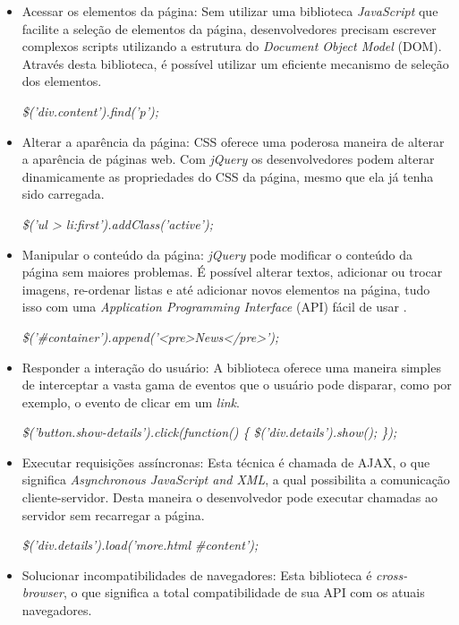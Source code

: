 \begin{itemize}
\item Acessar os elementos da página: Sem utilizar uma biblioteca \textit{JavaScript} que facilite a seleção de elementos da página, desenvolvedores precisam escrever complexos scripts utilizando a estrutura do \textit{Document Object Model} (DOM). Através desta biblioteca, é possível utilizar um eficiente mecanismo de seleção dos elementos.

\begin{center}
\textit{\$('div.content').find('p');}
\end{center}

\item Alterar a aparência da página: CSS oferece uma poderosa maneira de alterar a aparência de páginas web. Com \textit{jQuery} os desenvolvedores podem alterar dinamicamente as propriedades do CSS da página, mesmo que ela já tenha sido carregada.

\begin{center}
\textit{\$('ul > li:first').addClass('active');}
\end{center}

\item Manipular o conteúdo da página: \textit{jQuery} pode modificar o conteúdo da página sem maiores problemas. É possível alterar textos, adicionar ou trocar imagens, re-ordenar listas e até adicionar novos elementos na página, tudo isso com uma \textit{Application Programming Interface} (API) fácil de usar \cite{JQUERY-API}.

\begin{center}
\textit{\$('\#container').append('<pre>News</pre>');}
\end{center}

\item Responder a interação do usuário: A biblioteca oferece uma maneira simples de interceptar a vasta gama de eventos que o usuário pode disparar, como por exemplo, o evento de clicar em um \textit{link}.

\begin{center}
\textit{\$('button.show-details').click(function() \{ \$('div.details').show(); \});}
\end{center}

\item Executar requisições assíncronas: Esta técnica é chamada de AJAX, o que significa \textit{Asynchronous JavaScript and XML}, a qual possibilita a comunicação cliente-servidor. Desta maneira o desenvolvedor pode executar chamadas ao servidor sem recarregar a página.

\begin{center}
\textit{\$('div.details').load('more.html \#content');}
\end{center}

\item Solucionar incompatibilidades de navegadores: Esta biblioteca é \textit{cross-browser}, o que significa a total compatibilidade de sua API com os atuais navegadores.
\end{itemize}


